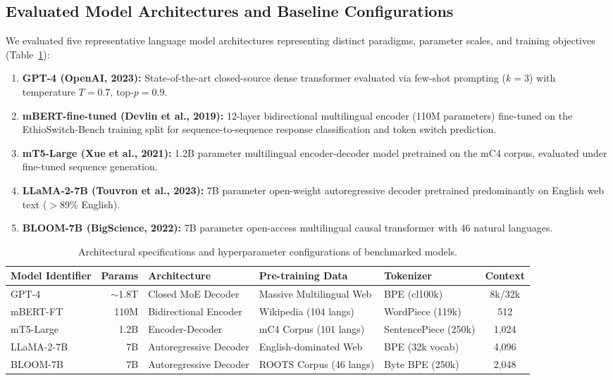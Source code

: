 \documentclass[11pt,a4paper]{article}
\begin{document}
\subsection{Evaluated Model Architectures and Baseline Configurations}
We evaluated five representative language model architectures representing distinct paradigms, parameter scales, and training objectives (Table~\ref{tab:models}):
\begin{enumerate}
    \item \textbf{GPT-4 (OpenAI, 2023):} State-of-the-art closed-source dense transformer evaluated via few-shot prompting ($k=3$) with temperature $T=0.7$, $\text{top-}p=0.9$.
    \item \textbf{mBERT-fine-tuned (Devlin et al., 2019):} 12-layer bidirectional multilingual encoder (110M parameters) fine-tuned on the EthioSwitch-Bench training split for sequence-to-sequence response classification and token switch prediction.
    \item \textbf{mT5-Large (Xue et al., 2021):} 1.2B parameter multilingual encoder-decoder model pretrained on the mC4 corpus, evaluated under fine-tuned sequence generation.
    \item \textbf{LLaMA-2-7B (Touvron et al., 2023):} 7B parameter open-weight autoregressive decoder pretrained predominantly on English web text ($>$89\% English).
    \item \textbf{BLOOM-7B (BigScience, 2022):} 7B parameter open-access multilingual causal transformer with 46 natural languages.
\end{enumerate}

\begin{table}[htbp]
\centering
\small
\caption{Architectural specifications and hyperparameter configurations of benchmarked models.}
\label{tab:models}
\begin{tabular}{lrlllc}
\toprule
\textbf{Model Identifier} & \textbf{Params} & \textbf{Architecture} & \textbf{Pre-training Data} & \textbf{Tokenizer} & \textbf{Context} \\
\midrule
GPT-4 & $\sim$1.8T & Closed MoE Decoder & Massive Multilingual Web & BPE (cl100k) & 8k/32k \\
mBERT-FT & 110M & Bidirectional Encoder & Wikipedia (104 langs) & WordPiece (119k) & 512 \\
mT5-Large & 1.2B & Encoder-Decoder & mC4 Corpus (101 langs) & SentencePiece (250k) & 1,024 \\
LLaMA-2-7B & 7B & Autoregressive Decoder & English-dominated Web & BPE (32k vocab) & 4,096 \\
BLOOM-7B & 7B & Autoregressive Decoder & ROOTS Corpus (46 langs) & Byte BPE (250k) & 2,048 \\
\bottomrule
\end{tabular}
\end{table}
\end{document}
